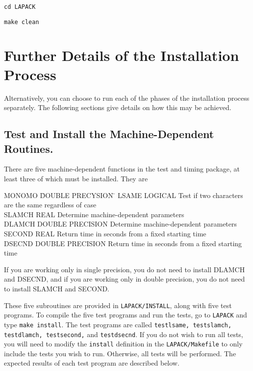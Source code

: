 \begin{list}{}{}
\item {\tt cd LAPACK}
\item {\tt make clean}
\end{list}

\section{Further Details of the Installation Process}\label{furtherdetails}

Alternatively, you can choose to run each of the phases of the
installation process separately.  The following sections give details
on how this may be achieved.

\subsection{Test and Install the Machine-Dependent Routines.}
\dent
There are five machine-dependent functions in the test and timing
package, at least three of which must be installed.  They are

\begin{tabbing}
MONOMO  \=  DOUBLE PRECYSION  \=  \kill
LSAME   \>  LOGICAL      \> Test if two characters are the same regardless of case \\
SLAMCH  \>  REAL  \> Determine machine-dependent parameters \\
DLAMCH  \>  DOUBLE PRECISION \> Determine machine-dependent parameters \\
SECOND  \>  REAL  \> Return time in seconds from a fixed starting time \\
DSECND  \>  DOUBLE PRECISION  \> Return time in seconds from a fixed starting time
\end{tabbing}

\noindent
If you are working only in single precision, you do not need to install
DLAMCH and DSECND, and if you are working only in double precision,
you do not need to install SLAMCH and SECOND.

These five subroutines are provided in {\tt LAPACK/INSTALL},
along with five test programs.
To compile the five test programs and run the tests, go to {\tt LAPACK} and
type {\tt make install}.  The test programs are called
{\tt testlsame, testslamch, testdlamch, testsecond,} and
{\tt testdsecnd}. 
If you do not wish to run all tests, you will need to modify the 
{\tt install} definition in the {\tt LAPACK/Makefile} to only include the
tests you wish to run.  Otherwise, all tests will be performed.
The expected results of each test program are described below.

